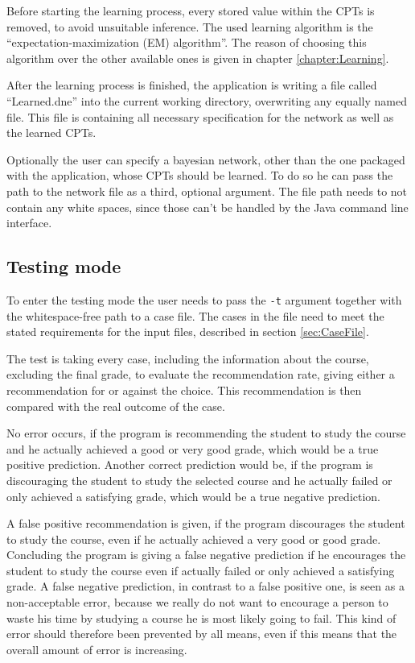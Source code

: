 \documentclass[%
	pdftex,
	oneside,        %
	11pt,           %
	parskip=half,   %
	headsepline,    %
	footsepline,    %
	abstracton,     %
	USenglish,      %
	a4paper,        %
]{report}
\begin{document}
Before starting the learning process, every stored value within the CPTs is removed, to avoid unsuitable inference. The used learning algorithm is the \enquote{expectation-maximization (EM) algorithm}. The reason of choosing this algorithm over the other available ones is given in chapter \vref{chapter:Learning}.

After the learning process is finished, the application is writing a file called \enquote{Learned.dne} into the current working directory, overwriting any equally named file. This file is containing all necessary specification for the network as well as the learned CPTs.

Optionally the user can specify a bayesian network, other than the one packaged with the application, whose CPTs should be learned. To do so he can pass the path to the network file as a third, optional argument. The file path needs to not contain any white spaces, since those can't be handled by the Java command line interface.

\subsection{Testing mode}
\label{sec:Test}
To enter the testing mode the user needs to pass the \texttt{-t} argument together with the whitespace-free path to a case file. The cases in the file need to meet the stated requirements for the input files, described in section \vref{sec:CaseFile}.

The test is taking every case, including the information about the course, excluding the final grade, to evaluate the recommendation rate, giving either a recommendation for or against the choice. This recommendation is then compared with the real outcome of the case.

No error occurs, if the program is recommending the student to study the course and he actually achieved a good or very good grade, which would be a true positive prediction. Another correct prediction would be, if the program is discouraging the student to study the selected course and he actually failed or only achieved a satisfying grade, which would be a true negative prediction.

A false positive recommendation is given, if the program discourages the student to study the course, even if he actually achieved a very good or good grade. Concluding the program is giving a false negative prediction if he encourages the student to study the course even if actually failed or only achieved a satisfying grade. A false negative prediction, in contrast to a false positive one, is seen as a non-acceptable error, because we really do not want to encourage a person to waste his time by studying a course he is most likely going to fail. This kind of error should therefore been prevented by all means, even if this means that the overall amount of error is increasing.
\end{document}

